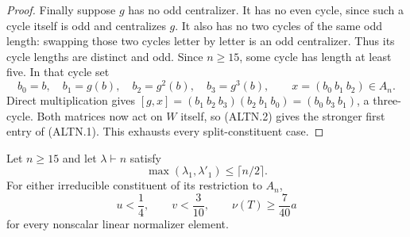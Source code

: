 \begin{proof}
Finally suppose $g$ has no odd centralizer. It has no even
cycle, since such a cycle itself is odd and centralizes $g$.
It also has no two cycles of the same odd length: swapping
those two cycles letter by letter is an odd centralizer.
Thus its cycle lengths are distinct and odd. Since $n\ge15$,
some cycle has length at least five. In that cycle set
\[
 b_0=b,\quad b_1=g(b),\quad b_2=g^2(b),\quad b_3=g^3(b),
 \qquad x=(b_0\ b_1\ b_2)\in A_n.
\]
Direct multiplication gives
$[g,x]=(b_1\ b_2\ b_3)(b_2\ b_1\ b_0)
=(b_0\ b_3\ b_1)$, a three-cycle. Both matrices now act on
$W$ itself, so (ALTN.2) gives the stronger first entry of
(ALTN.1). This exhausts every split-constituent case.
\end{proof}

\begin{lemma}
\label{HD-ALT-03b}
Let $n\ge15$ and let $\lambda\vdash n$ satisfy
\[
             \max(\lambda_1,\lambda'_1)\le\lceil n/2\rceil.
                                                               \tag{ALTN.3}
\]
For either irreducible constituent of its restriction to $A_n$,
\[
 u<\frac14,\qquad v<\frac3{10},\qquad
                 \nu(T)\ge\frac7{40}a                 \tag{ALTN.4}
\]
for every nonscalar linear normalizer element.
\end{lemma}

